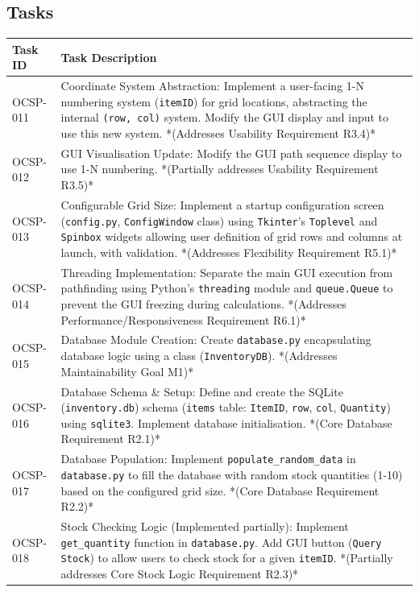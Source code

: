 \subsection{Tasks}

\begin{table}[htbp]
\centering
\begin{tabularx}{\textwidth}{|l|X|}
	\hline
	\textbf{Task ID} & \textbf{Task Description} \\
	\hline
	OCSP-011 & Coordinate System Abstraction: Implement a user-facing 1-N numbering system (\texttt{itemID}) for grid locations, abstracting the internal \texttt{(row, col)} system. Modify the GUI display and input to use this new system. *(Addresses Usability Requirement R3.4)* \\
	\hline
	OCSP-012 & GUI Visualisation Update: Modify the GUI path sequence display to use 1-N numbering. *(Partially addresses Usability Requirement R3.5)* \\
	\hline
	OCSP-013 & Configurable Grid Size: Implement a startup configuration screen (\texttt{config.py}, \texttt{ConfigWindow} class) using \texttt{Tkinter}'s \texttt{Toplevel} and \texttt{Spinbox} widgets allowing user definition of grid rows and columns at launch, with validation. *(Addresses Flexibility Requirement R5.1)* \\
	\hline
	OCSP-014 & Threading Implementation: Separate the main GUI execution from pathfinding using Python's \texttt{threading} module and \texttt{queue.Queue} to prevent the GUI freezing during calculations. *(Addresses Performance/Responsiveness Requirement R6.1)* \\
	\hline
	OCSP-015 & Database Module Creation: Create \texttt{database.py} encapsulating database logic using a class (\texttt{InventoryDB}). *(Addresses Maintainability Goal M1)* \\
	\hline
	OCSP-016 & Database Schema \& Setup: Define and create the SQLite (\texttt{inventory.db}) schema (\texttt{items} table: \texttt{ItemID}, \texttt{row}, \texttt{col}, \texttt{Quantity}) using \texttt{sqlite3}. Implement database initialisation. *(Core Database Requirement R2.1)* \\
	\hline
	OCSP-017 & Database Population: Implement \texttt{populate\_random\_data} in \texttt{database.py} to fill the database with random stock quantities (1-10) based on the configured grid size. *(Core Database Requirement R2.2)* \\
	\hline
	OCSP-018 & Stock Checking Logic (Implemented partially): Implement \texttt{get\_quantity} function in \texttt{database.py}. Add GUI button (\texttt{Query Stock}) to allow users to check stock for a given \texttt{itemID}. *(Partially addresses Core Stock Logic Requirement R2.3)* \\

\end{tabularx}
\end{table}
